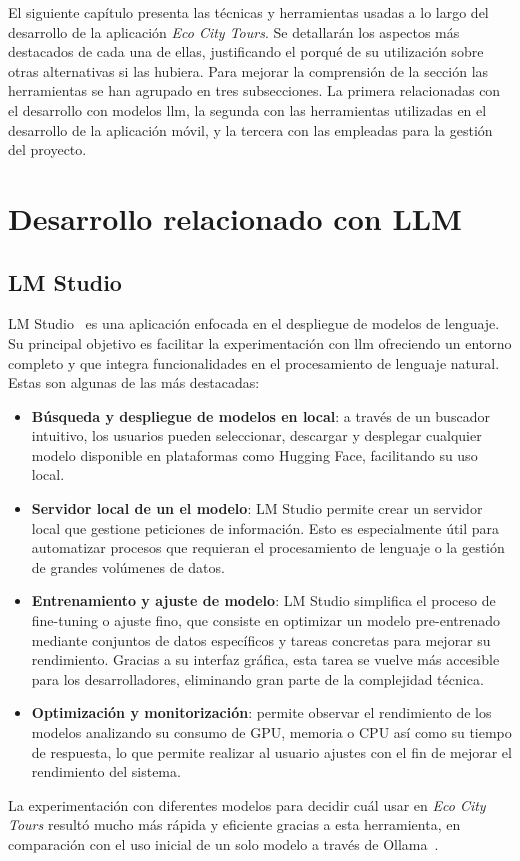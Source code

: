 
El siguiente capítulo presenta las técnicas y herramientas usadas a lo largo del desarrollo de la aplicación \textit{Eco City Tours}. Se detallarán los aspectos más destacados de cada una de ellas, justificando el porqué de su utilización sobre otras alternativas si las hubiera. Para mejorar la comprensión de la sección las herramientas se han agrupado en tres subsecciones. La primera relacionadas con el desarrollo con modelos \acrshort{llm}, la segunda con las herramientas utilizadas en el desarrollo de la aplicación móvil, y la tercera con las empleadas para la gestión del proyecto.


\section{Desarrollo relacionado con LLM}
	\subsection{LM Studio}
	LM Studio~\cite{lmstudio_ai} es una aplicación enfocada en el despliegue de modelos de lenguaje. Su principal objetivo es facilitar la experimentación con \acrlong{llm} ofreciendo un entorno completo y que integra funcionalidades en el procesamiento de lenguaje natural.
	Estas son algunas de las más destacadas:
	
	
	\begin{itemize}
		
		\item \textbf{Búsqueda y despliegue de modelos en local}: a través de un buscador intuitivo, los usuarios pueden seleccionar, descargar y desplegar cualquier modelo disponible en plataformas como Hugging Face, facilitando su uso local.
		
		\item \textbf{Servidor local de un el modelo}: LM Studio permite crear un servidor local que gestione peticiones de información. Esto es especialmente útil para automatizar procesos que requieran el procesamiento de lenguaje o la gestión de grandes volúmenes de datos.
		
		\item \textbf{Entrenamiento y ajuste de modelo}: LM Studio simplifica el proceso de fine-tuning o ajuste fino, que consiste en optimizar un modelo pre-entrenado mediante conjuntos de datos específicos y tareas concretas para mejorar su rendimiento. Gracias a su interfaz gráfica, esta tarea se vuelve más accesible para los desarrolladores, eliminando gran parte de la complejidad técnica.
		
		\item \textbf{Optimización y monitorización}: permite observar el rendimiento de los modelos analizando su consumo de GPU, memoria o CPU así como su tiempo de respuesta, lo que permite realizar al usuario ajustes con el fin de mejorar el rendimiento del sistema.
	\end{itemize}
	La experimentación con diferentes modelos para decidir cuál usar en \textit{Eco City Tours} resultó mucho más rápida y eficiente gracias a esta herramienta, en comparación con el uso inicial de un solo modelo a través de Ollama~\cite{ollama}.
		
